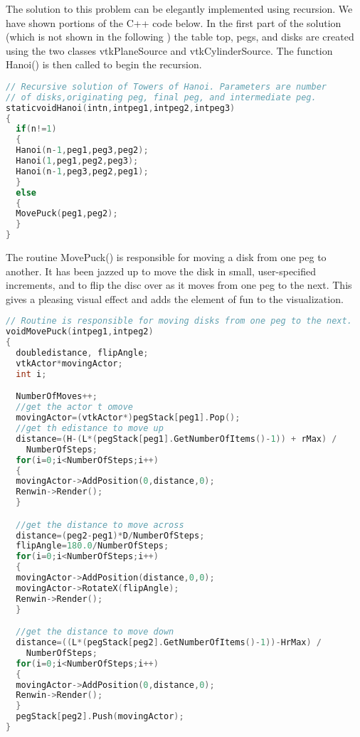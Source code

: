 The solution to this problem can be elegantly implemented using recursion. We have shown portions of the C++ code below.
In the first part of the solution (which is not shown in the following ) the table top, pegs, and disks are created using the two classes vtkPlaneSource and vtkCylinderSource. The function Hanoi() is then called to begin the recursion.

\begin{lstlisting}[language=C++, caption={Recursive solution for the Towers of Hanoi.}]
// Recursive solution of Towers of Hanoi. Parameters are number
// of disks,originating peg, final peg, and intermediate peg.
staticvoidHanoi(intn,intpeg1,intpeg2,intpeg3)
{
  if(n!=1)
  {
  Hanoi(n-1,peg1,peg3,peg2);
  Hanoi(1,peg1,peg2,peg3);
  Hanoi(n-1,peg3,peg2,peg1);
  }
  else
  {
  MovePuck(peg1,peg2);
  }
}
\end{lstlisting}

The routine MovePuck() is responsible for moving a disk from one peg to another. It has been jazzed up to move the disk in small, user-specified increments, and to flip the disc over as it moves from one peg to the next. This gives a pleasing visual effect and adds the element of fun to the visualization.

\begin{lstlisting}[language=C++, caption={Moving the puck.}]
// Routine is responsible for moving disks from one peg to the next.
voidMovePuck(intpeg1,intpeg2)
{
  doubledistance, flipAngle;
  vtkActor*movingActor;
  int i;

  NumberOfMoves++;
  //get the actor t omove
  movingActor=(vtkActor*)pegStack[peg1].Pop();
  //get th edistance to move up
  distance=(H-(L*(pegStack[peg1].GetNumberOfItems()-1)) + rMax) /
    NumberOfSteps;
  for(i=0;i<NumberOfSteps;i++)
  {
  movingActor->AddPosition(0,distance,0);
  Renwin->Render();
  }

  //get the distance to move across
  distance=(peg2-peg1)*D/NumberOfSteps;
  flipAngle=180.0/NumberOfSteps;
  for(i=0;i<NumberOfSteps;i++)
  {
  movingActor->AddPosition(distance,0,0);
  movingActor->RotateX(flipAngle);
  Renwin->Render();
  }

  //get the distance to move down
  distance=((L*(pegStack[peg2].GetNumberOfItems()-1))-HrMax) /
    NumberOfSteps;
  for(i=0;i<NumberOfSteps;i++)
  {
  movingActor->AddPosition(0,distance,0);
  Renwin->Render();
  }
  pegStack[peg2].Push(movingActor);
}
\end{lstlisting}

